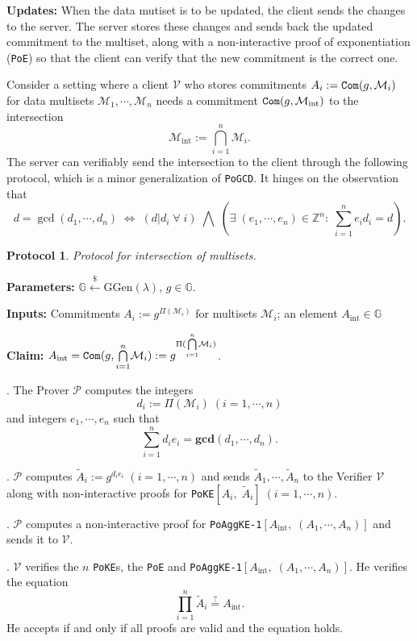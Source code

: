 \documentclass[11pt, lettersize, notitlepage, leqno, footskip=0.6cm]{article}
\newcommand{\bz}{\mathbb Z}
\newcommand{\pl}{\prod\limits}
\newcommand{\LRA}{\Longleftrightarrow}
\newcommand{\wti}{\widetilde}
\newcommand{\mc}{\mathcal}
\newcommand{\mb}{\mathbb}
\newcommand{\mbf}{\mathbf}
\newcommand{\mr}{\mathrm}
\newcommand{\lamb}{\lambda}
\newcommand{\mP}{\mc{P}}
\newcommand{\V}{\mc{V}}
\newcommand{\vs}{\vspace{-0.15cm}}
\newcommand{\noin}{\noindent}
\newcommand{\sta}{\stackrel{?}{=}}
\newcommand{\GCD}{\mbf{gcd}}
\newtheorem{Prot}[Thm]{Protocol}
\numberwithin{equation}{section}
\begin{document}
\noin \textbf{Updates:} When the data mutiset is to be updated, the client sends the changes to the server. The server stores these changes and sends back the updated commitment to the multiset, along with a non-interactive proof of exponentiation (\verb|PoE|) so that the client can verify that the new commitment is the correct one. \vspace{0.1cm}

Consider a setting where a client $\mc{V}$ who stores commitments $A_i:= \protect{\verb|Com|}(g, \mc{M}_i)$ for data multisets $\mc{M}_1, \cdots, \mc{M}_n$ needs a commitment $\protect{\verb|Com|}(g, \mc{M}_{\mr{int}})$ to the intersection \vs $$\mc{M}_{\mr{int}}:=\bigcap\limits_{i=1}^n \mc{M}_i .$$ The server can verifiably send the intersection to the client through the following protocol, which is a minor generalization of \verb|PoGCD|. It hinges on the observation that \vs $$d = \gcd(d_1,\cdots,d_n)\; \LRA\; (d|d_i\;\forall\;i)\;\bigwedge\; (\exists\;(e_1,\cdots,e_n)\in\bz^n:\;\sum\limits_{i=1}^n e_id_i = d ).$$

\vspace{0.1cm}

\begin{Prot} Protocol for intersection of multisets.\end{Prot} \vspace{-0.3cm}

\noin \textbf{Parameters:} $\mb{G}\xleftarrow{\$} \mr{GGen}(\lamb)$,\; $g\in \mb{G}$.

\noin \textbf{Inputs:} Commitments $A_i := g^{\Pi(\mc{M}_i)}$ for multisets $\mc{M}_i$; an element $A_{\mr{int}}\in\mb{G}$

\noin \textbf{Claim:} $A_{\mr{int}} = \protect{\verb|Com|}(g, {\bigcap\limits_{i=1}^n} \mc{M}_i) := g^{\Pi({\bigcap\limits_{i=1}^n} \mc{M}_i)}$.

\begin{prf1} \normalfont \noin 1. The Prover $\mP$ computes the integers \vs $$d_i:= \Pi(\mc{M}_i)\; (i=1,\cdots,n)$$ and integers $e_1,\cdots,e_n$ such that \vs $$\sum\limits_{i=1}^n d_ie_i = \GCD(d_1,\cdots,d_n).$$

\noin 2. $\mP$ computes $\wti{A}_i:= g^{d_ie_i} \; (i=1,\cdots,n)$ and sends $\wti{A}_1,\cdots, \wti{A}_n$ to the Verifier $\V$ along with non-interactive proofs for \verb|PoKE|$[A_i,\;\wti{A}_i]\; (i=1,\cdots,n)$.


\noin 3. $\mP$ computes a non-interactive proof for \verb|PoAggKE-1|$[A_{\mr{int}},\;(A_1,\cdots,A_n)]$ and sends it to $\V$.

\noin 4. $\V$ verifies the $n$ \verb|PoKE|s, the  \verb|PoE| and \verb|PoAggKE-1|$[A_{\mr{int}},\;(A_1,\cdots,A_n)]$. He verifies the equation \vs $$\pl_{i=1}^n \wti{A}_i\sta A_{\mr{int}}.$$ He accepts if and only if all proofs are valid and the equation holds.\end{prf1}
\end{document}
